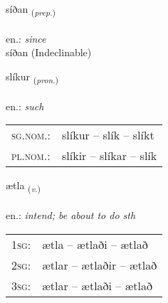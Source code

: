 \documentclass[frontgrid, backgrid]{flacards}\usepackage[]{graphicx}\usepackage[]{xcolor}
\begin{document}
{síðan \small{\textsubscript{(\textit{prep.})}} \\[1ex]
\textphonetic{[siːðan]} \\
en.: \emph{since} \\  [2ex]
síðan (Indeclinable)}

\renewcommand{\flhead}{\vskip5pt \fboxsep=0pt {\small\bfseries\footnotesize Fornafn | Pronoun}}
\renewcommand{\fcfoot}{\vskip5pt \fboxsep=0pt \hspace{2pt}{\small\bfseries\footnotesize 1K}}

\renewcommand{\blhead}{\vskip5pt {\small\bfseries\footnotesize Fornafn | Pronoun }}
\renewcommand{\bcfoot}{\vskip5pt \hspace{2pt}{\small\bfseries\footnotesize 1K}}


{slíkur \small{\textsubscript{(\textit{pron.})}} \\[1ex] %
\textphonetic{[stliːkʏr]} \\
en.: \emph{such} \\  [2ex]
\renewcommand*{\arraystretch}{0.8}
\begin{tabular}{ll}
\textsc{sg.nom.}: & slíkur  --  slík -- slíkt \\ 
\textsc{pl.nom.}: & slíkir -- slíkar -- slík
\end{tabular}
}

\renewcommand{\flhead}{\vskip5pt \fboxsep=0pt {\small\bfseries\footnotesize Sagnorð | Verb}}
\renewcommand{\fcfoot}{\vskip5pt \fboxsep=0pt \hspace{2pt}{\small\bfseries\footnotesize 1K}}

\renewcommand{\blhead}{\vskip5pt {\small\bfseries\footnotesize Sagnorð | Verb }}
\renewcommand{\bcfoot}{\vskip5pt \hspace{2pt}{\small\bfseries\footnotesize 1K}}


{ætla \small{\textsubscript{(\textit{v.})}} \\[1ex] %
\textphonetic{[aihtla]} \\
en.: \emph{intend; be about to do sth} \\  [2ex]
\renewcommand*{\arraystretch}{0.8}
\begin{tabular}{p{1cm}l}
\textsc{1sg}: & ætla -- ætlaði -- ætlað \\ 
\textsc{2sg}: & ætlar -- ætlaðir -- ætlað \\ 
\textsc{3sg}: & ætlar -- ætlaði -- ætlað \\ 
\end{tabular}
}
\end{document}
